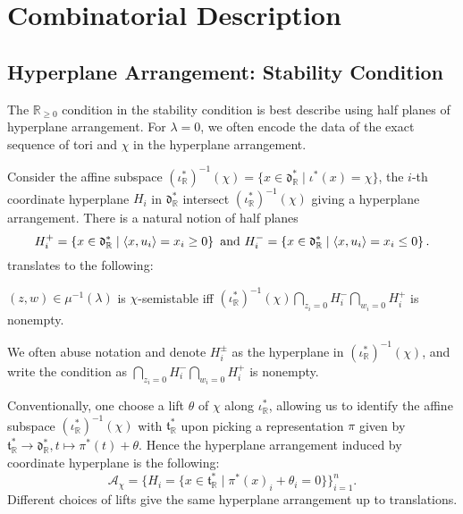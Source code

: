 \documentclass[b5paper]{article}
\begin{document}
\section{Combinatorial Description}

\subsection{Hyperplane Arrangement: Stability Condition}

The $\mathbb{R}_{\geq 0}$ condition in the stability condition is best describe using half planes of hyperplane arrangement.
For $\lambda=0$, we often encode the data of the exact sequence of tori and $\chi$ in the hyperplane arrangement. 

Consider the affine subspace $ (\iota_{\mathbb{R}}^*)^{-1}(\chi) = \{ x \in \mathfrak{d}_{\mathbb{R}}^* \mid \iota^*(x) = \chi \} $, the $i$-th coordinate hyperplane $H_i$ in $\mathfrak{d}_\mathbb{R}^*$ intersect $(\iota_{\mathbb{R}}^*)^{-1}(\chi)$ giving a hyperplane arrangement. There is a natural notion of half planes 
\[
H_i^+=\left\{x\in \mathfrak{d}^*_\mathbb{R}\mid \langle x,u_i\rangle=x_i\geq 0\right\}
\textnormal{ and }
H_i^-=\left\{x\in \mathfrak{d}^*_\mathbb{R}\mid \langle x,u_i\rangle=x_i\leq 0\right\}.
\]
 translates to the following:

\begin{lemma}[lem:]{}
  $(z,w)\in \mu^{-1}(\lambda)$ is $\chi$-semistable iff $(\iota_{\mathbb{R}}^*)^{-1}(\chi)\bigcap _{z_i=0}H_i^-\bigcap _{w_i=0}H_i^+$ is nonempty. 
  \begin{remark}
    We often abuse notation and denote $H_i^{\pm}$ as the hyperplane in $(\iota^*_{\mathbb{R}})^{-1}(\chi)$, and write the condition as $\bigcap _{z_i=0}H_i^-\bigcap _{w_i=0}H_i^+$ is nonempty. 
  \end{remark}
\end{lemma}

Conventionally, one choose a lift $\theta$ of $\chi$ along $\iota_\mathbb{R}^*$, allowing us to identify the affine subspace $(\iota_{\mathbb{R}}^*)^{-1}(\chi)$ with $\mathfrak{t}_\mathbb{R}^*$ upon picking a representation $\pi$ given by $\mathfrak{t}^*_\mathbb{R}\rightarrow \mathfrak{d}_\mathbb{R}^*, t\mapsto \pi^*(t)+\theta$. Hence the hyperplane arrangement induced by coordinate hyperplane is the following:
\begin{equation*}
    \mathcal{A}_\chi = \{ H_i = \{ x \in \mathfrak{t}_{\mathbb{R}}^* \mid \pi^*(x)_i + \theta_i = 0\} \}_{i=1}^n.
\end{equation*}
Different choices of lifts give the same hyperplane arrangement up to translations.
\end{document}
